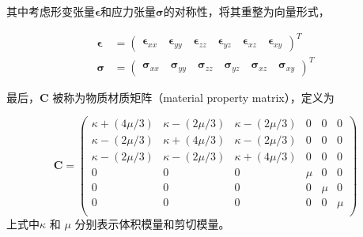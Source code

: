 其中考虑形变张量$\mathbf{\epsilon}$和应力张量$\mathbf{\sigma} $的对称性，将其重整为向量形式，

\begin{equation}
\begin{aligned}
\mathbf{\epsilon} &= \left(
                      \begin{array}{ccccccc}
                         \mathbf{\epsilon}_{xx}\quad
                         \mathbf{\epsilon}_{yy}\quad
                         \mathbf{\epsilon}_{zz}\quad
                         \mathbf{\epsilon}_{yz}\quad
                         \mathbf{\epsilon}_{xz}\quad
                         \mathbf{\epsilon}_{xy}
                      \end{array}
                    \right)^T\\
\mathbf{\sigma} &= \left(
                      \begin{array}{cccccc}
                         \mathbf{\sigma}_{xx}\quad
                         \mathbf{\sigma}_{yy}\quad
                         \mathbf{\sigma}_{zz}\quad
                         \mathbf{\sigma}_{yz}\quad
                         \mathbf{\sigma}_{xz}\quad
                         \mathbf{\sigma}_{xy}
                      \end{array}
                  \right)^T
\end{aligned}
\end{equation}

最后，$\textbf{C}$ 被称为物质材质矩阵（material property matrix），定义为

\begin{equation}
\textbf{C} = \left(
               \begin{array}{cccccc}
                 \kappa + (4\mu/3) & \kappa - (2\mu/3) & \kappa - (2\mu/3) & 0 & 0 & 0 \\
                 \kappa - (2\mu/3) & \kappa + (4\mu/3) & \kappa - (2\mu/3) & 0 & 0 & 0 \\
                 \kappa - (2\mu/3) & \kappa - (2\mu/3) & \kappa + (4\mu/3) & 0 & 0 & 0 \\
                 0 & 0 & 0 & \mu & 0 & 0 \\
                 0 & 0 & 0 & 0 & \mu & 0 \\
                 0 & 0 & 0 & 0 & 0 & \mu \\
               \end{array}
             \right)
\end{equation}
上式中$\kappa$ 和 $\mu$ 分别表示体积模量和剪切模量。

